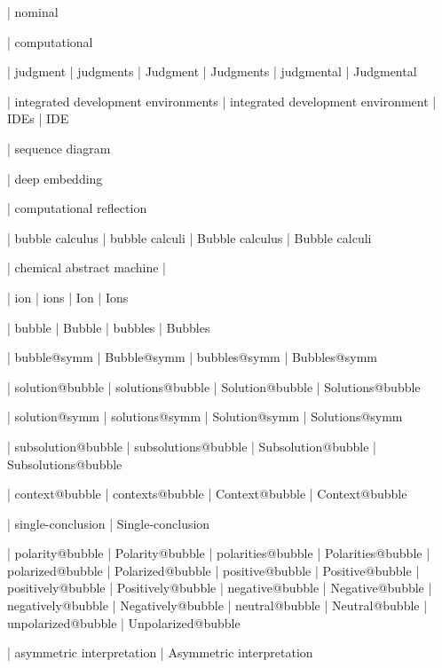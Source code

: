  | nominal

 | computational

 | judgment
 | judgments
 | Judgment
 | Judgments
 | judgmental
 | Judgmental


 | integrated development environments
 | integrated development environment
 | IDEs
 | IDE

 | sequence diagram

 | deep embedding

 | computational reflection


 | bubble calculus
 | bubble calculi
 | Bubble calculus
 | Bubble calculi

 | chemical abstract machine
 | \cham
 
 | ion
 | ions
 | Ion
 | Ions

 | bubble
 | Bubble
 | bubbles
 | Bubbles

 | bubble@symm
 | Bubble@symm
 | bubbles@symm
 | Bubbles@symm

 | solution@bubble
 | solutions@bubble
 | Solution@bubble
 | Solutions@bubble

 | solution@symm
 | solutions@symm
 | Solution@symm
 | Solutions@symm

 | subsolution@bubble
 | subsolutions@bubble
 | Subsolution@bubble
 | Subsolutions@bubble

 | context@bubble
 | contexts@bubble
 | Context@bubble
 | Context@bubble

 | single-conclusion
 | Single-conclusion

 | polarity@bubble
 | Polarity@bubble
 | polarities@bubble
 | Polarities@bubble
 | polarized@bubble
 | Polarized@bubble
 | positive@bubble
 | Positive@bubble
 | positively@bubble
 | Positively@bubble
 | negative@bubble
 | Negative@bubble
 | negatively@bubble
 | Negatively@bubble
 | neutral@bubble
 | Neutral@bubble
 | unpolarized@bubble
 | Unpolarized@bubble

 | asymmetric interpretation
 | Asymmetric interpretation

